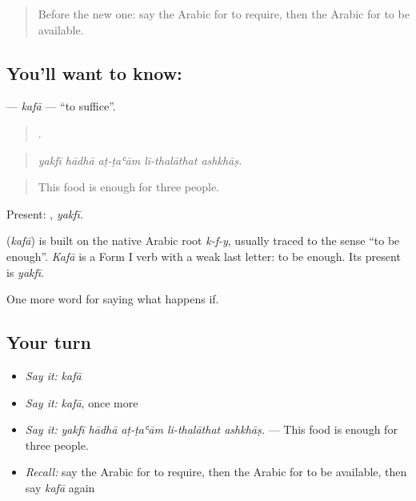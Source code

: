 \label{lesson:AR-C406-kafa}



\begin{quote}
Before the new one: say the Arabic for to require, then the Arabic for to be available.
\end{quote}

\subsection*{You'll want to know: }
\textbf{} — \emph{kafā} — \textquotedblleft{}to suffice\textquotedblright{}.

\begin{quote}
    .
\end{quote}

\begin{quote}
\emph{yakfī hādhā aṭ-ṭaʿām li-thalāthat ashkhāṣ.}
\end{quote}

\begin{quote}
This food is enough for three people.
\end{quote}

Present: , \emph{yakfī}.

\begin{cousinweb}
\textbf{} (\emph{kafā}) is built on the native Arabic root \emph{k-f-y}, usually traced to the sense \textquotedblleft{}to be enough\textquotedblright{}. \emph{Kafā} is a Form I verb with a weak last letter: to be enough. Its present is \emph{yakfī}.
\end{cousinweb}

\begin{grammarlens}[title={What you've built}]
One more word for saying what happens if.
\end{grammarlens}

\subsection*{Your turn}
\begin{itemize}
\raggedright
  \item \emph{Say it:} \emph{kafā}
  \item \emph{Say it:} \emph{kafā}, once more
  \item \emph{Say it:} \emph{yakfī hādhā aṭ-ṭaʿām li-thalāthat ashkhāṣ.} — This food is enough for three people.
  \item \emph{Recall:} say the Arabic for to require, then the Arabic for to be available, then say \emph{kafā} again
\end{itemize}


